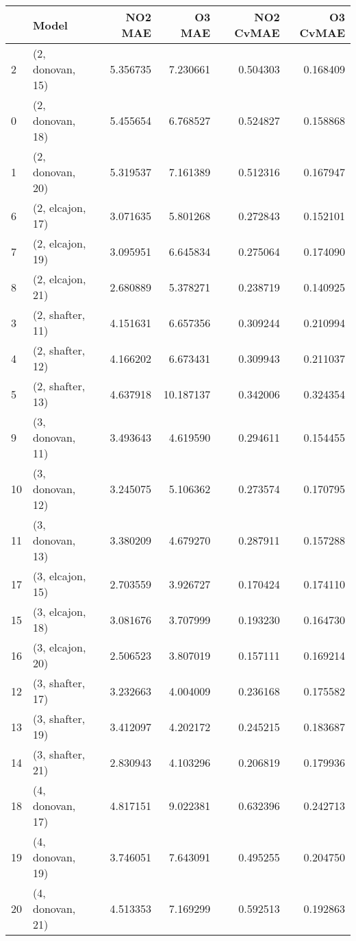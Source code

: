 \begin{tabular}{llrrrr}
\toprule
{} &             Model &    NO2 MAE &     O3 MAE &  NO2 CvMAE &  O3 CvMAE \\
\midrule
2  &  (2, donovan, 15) &   5.356735 &   7.230661 &   0.504303 &  0.168409 \\
0  &  (2, donovan, 18) &   5.455654 &   6.768527 &   0.524827 &  0.158868 \\
1  &  (2, donovan, 20) &   5.319537 &   7.161389 &   0.512316 &  0.167947 \\
6  &  (2, elcajon, 17) &   3.071635 &   5.801268 &   0.272843 &  0.152101 \\
7  &  (2, elcajon, 19) &   3.095951 &   6.645834 &   0.275064 &  0.174090 \\
8  &  (2, elcajon, 21) &   2.680889 &   5.378271 &   0.238719 &  0.140925 \\
3  &  (2, shafter, 11) &   4.151631 &   6.657356 &   0.309244 &  0.210994 \\
4  &  (2, shafter, 12) &   4.166202 &   6.673431 &   0.309943 &  0.211037 \\
5  &  (2, shafter, 13) &   4.637918 &  10.187137 &   0.342006 &  0.324354 \\
9  &  (3, donovan, 11) &   3.493643 &   4.619590 &   0.294611 &  0.154455 \\
10 &  (3, donovan, 12) &   3.245075 &   5.106362 &   0.273574 &  0.170795 \\
11 &  (3, donovan, 13) &   3.380209 &   4.679270 &   0.287911 &  0.157288 \\
17 &  (3, elcajon, 15) &   2.703559 &   3.926727 &   0.170424 &  0.174110 \\
15 &  (3, elcajon, 18) &   3.081676 &   3.707999 &   0.193230 &  0.164730 \\
16 &  (3, elcajon, 20) &   2.506523 &   3.807019 &   0.157111 &  0.169214 \\
12 &  (3, shafter, 17) &   3.232663 &   4.004009 &   0.236168 &  0.175582 \\
13 &  (3, shafter, 19) &   3.412097 &   4.202172 &   0.245215 &  0.183687 \\
14 &  (3, shafter, 21) &   2.830943 &   4.103296 &   0.206819 &  0.179936 \\
18 &  (4, donovan, 17) &   4.817151 &   9.022381 &   0.632396 &  0.242713 \\
19 &  (4, donovan, 19) &   3.746051 &   7.643091 &   0.495255 &  0.204750 \\
20 &  (4, donovan, 21) &   4.513353 &   7.169299 &   0.592513 &  0.192863 \\

\end{tabular}

